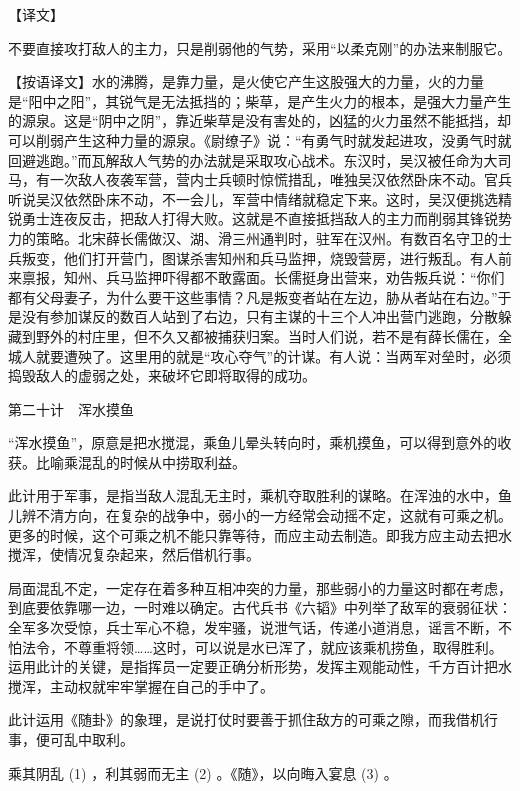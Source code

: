 \documentclass[12pt,UTF8]{ctexbook}
\begin{document}
【译文】


不要直接攻打敌人的主力，只是削弱他的气势，采用“以柔克刚”的办法来制服它。

【按语译文】水的沸腾，是靠力量，是火使它产生这股强大的力量，火的力量是“阳中之阳”，其锐气是无法抵挡的；柴草，是产生火力的根本，是强大力量产生的源泉。这是“阴中之阴”，靠近柴草是没有害处的，凶猛的火力虽然不能抵挡，却可以削弱产生这种力量的源泉。《尉缭子》说：“有勇气时就发起进攻，没勇气时就回避逃跑。”而瓦解敌人气势的办法就是采取攻心战术。东汉时，吴汉被任命为大司马，有一次敌人夜袭军营，营内士兵顿时惊慌措乱，唯独吴汉依然卧床不动。官兵听说吴汉依然卧床不动，不一会儿，军营中情绪就稳定下来。这时，吴汉便挑选精锐勇士连夜反击，把敌人打得大败。这就是不直接抵挡敌人的主力而削弱其锋锐势力的策略。北宋薛长儒做汉、湖、滑三州通判时，驻军在汉州。有数百名守卫的士兵叛变，他们打开营门，图谋杀害知州和兵马监押，烧毁营房，进行叛乱。有人前来禀报，知州、兵马监押吓得都不敢露面。长儒挺身出营来，劝告叛兵说：“你们都有父母妻子，为什么要干这些事情？凡是叛变者站在左边，胁从者站在右边。”于是没有参加谋反的数百人站到了右边，只有主谋的十三个人冲出营门逃跑，分散躲藏到野外的村庄里，但不久又都被捕获归案。当时人们说，若不是有薛长儒在，全城人就要遭殃了。这里用的就是“攻心夺气”的计谋。有人说：当两军对垒时，必须捣毁敌人的虚弱之处，来破坏它即将取得的成功。





第二十计　浑水摸鱼


“浑水摸鱼”，原意是把水搅混，乘鱼儿晕头转向时，乘机摸鱼，可以得到意外的收获。比喻乘混乱的时候从中捞取利益。

此计用于军事，是指当敌人混乱无主时，乘机夺取胜利的谋略。在浑浊的水中，鱼儿辨不清方向，在复杂的战争中，弱小的一方经常会动摇不定，这就有可乘之机。更多的时候，这个可乘之机不能只靠等待，而应主动去制造。即我方应主动去把水搅浑，使情况复杂起来，然后借机行事。

局面混乱不定，一定存在着多种互相冲突的力量，那些弱小的力量这时都在考虑，到底要依靠哪一边，一时难以确定。古代兵书《六韬》中列举了敌军的衰弱征状：全军多次受惊，兵士军心不稳，发牢骚，说泄气话，传递小道消息，谣言不断，不怕法令，不尊重将领……这时，可以说是水已浑了，就应该乘机捞鱼，取得胜利。运用此计的关键，是指挥员一定要正确分析形势，发挥主观能动性，千方百计把水搅浑，主动权就牢牢掌握在自己的手中了。

此计运用《随卦》的象理，是说打仗时要善于抓住敌方的可乘之隙，而我借机行事，便可乱中取利。





乘其阴乱 (1) ，利其弱而无主 (2) 。《随》，以向晦入宴息 (3) 。
\end{document}
